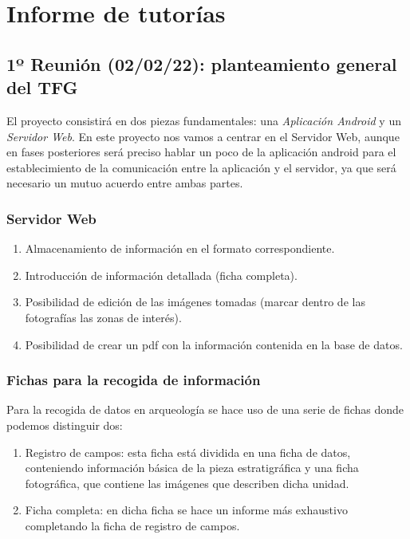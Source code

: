 \chapter{Informe de tutorías}
\section{1º Reunión (02/02/22): planteamiento general del TFG}
El proyecto consistirá en dos piezas fundamentales: una \textit{Aplicación Android} y un 
\textit{Servidor Web}. En este proyecto nos vamos a centrar en el Servidor Web, aunque en
fases posteriores será preciso hablar un poco de la aplicación android para el establecimiento
de la comunicación entre la aplicación y el servidor, ya que será necesario un mutuo acuerdo
entre ambas partes.

    \subsection{Servidor Web}

        \begin{enumerate}
            \item Almacenamiento de información en el formato correspondiente.
            \item Introducción de información detallada (ficha completa).
            \item Posibilidad de edición de las imágenes tomadas (marcar dentro de las
            fotografías las zonas de interés).
            \item Posibilidad de crear un pdf con la información contenida en la base de
            datos.
        \end{enumerate}

    \subsection{Fichas para la recogida de información}
    Para la recogida de datos en arqueología se hace uso de una serie de fichas donde podemos
    distinguir dos:

        \begin{enumerate}
            \item Registro de campos: esta ficha está dividida en una ficha de datos,
            conteniendo información básica de la pieza estratigráfica y una ficha fotográfica,
            que contiene las imágenes que describen dicha unidad.
            \item Ficha completa: en dicha ficha se hace un informe más exhaustivo completando
            la ficha de registro de campos.
        \end{enumerate}

